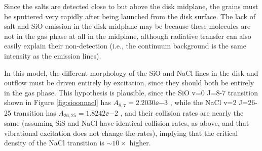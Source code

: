 \documentclass[twocolumn]{aastex62}
\newcommand{\bam}[1]{\textcolor{green!65!black}{\textbf{[BAM: #1]}}}
\newcommand{\ag}[1]{\textcolor{red!65!black}{\textbf{[AG: #1]}}}
\begin{document}
Since the salts are detected close to but above the disk midplane, the
grains must be sputtered very rapidly after being launched from the disk surface.
The lack of salt and SiO emission in the disk midplane may be because these
molecules are not in the gas phase at all in the midplane, although radiative
transfer can also easily explain their non-detection (i.e., the continuum
background is the same intensity as the emission lines).


In this model, the different morphology of the SiO and NaCl lines in the disk
and outflow must be driven entirely by excitation, since they should both be
entirely in the gas phase.  This hypothesis is plausible, since the
SiO v=0 J=8-7 transition shown in Figure \ref{fig:sioonnacl} has $A_{8,7} =
2.2030\ee{-3}$ \pers, while the NaCl v=2 J=26-25 transition has $A_{26,25} =
1.8242\ee{-2}$ \pers, and their collision rates are nearly the same (assuming SiS and NaCl have
identical collision rates, as above, and that vibrational excitation does not
change the rates), implying that the critical density of the
NaCl transition is $\sim10\times$ higher.



%
\end{document}
